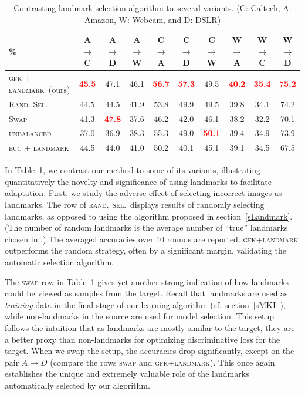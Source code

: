 \begin{table}[t]
\centering
\caption{Contrasting  landmark selection algorithm to several variants. (C: Caltech, A: Amazon,
W: Webcam, and D: DSLR) }%
\label{tVariants}
\begin{tabular}{lccccccccc}
\toprule
\% & A$\rightarrow$C & A$\rightarrow$D & A$\rightarrow$W & C$\rightarrow$A & C$\rightarrow$D & C$\rightarrow$W & W$\rightarrow$A & W$\rightarrow$C & W$\rightarrow$D\tabularnewline
\midrule
\textsc{gfk + landmark}~(ours) & \textbf{\textcolor{red}{45.5}} &  \textcolor{black}{47.1} & 46.1 & \textbf{\textcolor{red}{56.7}} & \textbf{\textcolor{red}{57.3}} & 49.5 & \textbf{\textcolor{red}{40.2}} & \textbf{\textcolor{red}{35.4}} & \textbf{\textcolor{red}{75.2}}\tabularnewline \midrule
\textsc{Rand. Sel.} & 44.5 & 44.5  & 41.9 & 53.8  & 49.9  & 49.5  & 39.8 & 34.1 & 74.2\tabularnewline 
\textsc{Swap} & 41.3 & \textbf{\textcolor{red}{47.8}} & 37.6 & 46.2 & 42.0 & 46.1 & 38.2 & 32.2 & 70.1\tabularnewline 
\textsc{unbalanced} & 37.0 & 36.9 & 38.3 & 55.3 & 49.0 & \textbf{\textcolor{red}{50.1}} & 39.4 & 34.9 & 73.9\tabularnewline
\textsc{euc + landmark} & 44.5 & 44.0 & 41.0 & 50.2 & 40.1 & 45.1 & 39.1 & 34.5 & 67.5\tabularnewline \bottomrule
\end{tabular}
\end{table}






In Table~\ref{tVariants}, we contrast our method to some of its variants, illustrating quantitatively the novelty and significance of using landmarks to facilitate adaptation. First, we study the adverse effect of selecting incorrect images as landmarks.  The row of \textsc{rand.~sel.}\  displays results of randomly selecting landmarks, as opposed to using the algorithm proposed in section~\ref{sLandmark}. (The number of random landmarks is the average number of ``true'' landmarks chosen in \ours.)
The averaged accuracies over 10 rounds are reported.   \textsc{gfk+landmark} outperforms the random strategy, often by a significant margin, validating the automatic selection algorithm.

The \textsc{swap} row in Table~\ref{tVariants} gives yet another strong indication of how landmarks could be viewed as  samples from the target. Recall that landmarks are used as \emph{training} data in the final stage of our learning algorithm (cf. section~\ref{sMKL}), while non-landmarks in the source are used for model selection. This setup follows the intuition that as landmarks are mostly similar to the target, they are a better proxy than non-landmarks for optimizing discriminative loss for the target. When we swap the setup, the accuracies drop significantly, except on the pair $A\rightarrow D$ (compare the rows \textsc{swap} and \textsc{gfk+landmark}).  This once again establishes the unique and extremely valuable role of the landmarks automatically selected by our algorithm.

